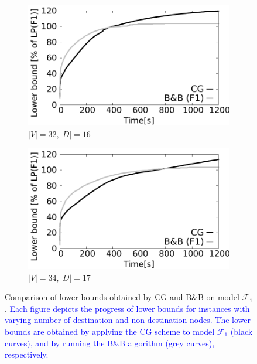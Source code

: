\begin{figure}[!htb]
    \begin{subfigure}[b]{0.49\textwidth}
        \includegraphics[width=\textwidth]{lower-bound-32-16}
        \caption{$|V|=32, |D|=16$}
        \label{fig:cggr32-16}
    \end{subfigure}
    \hfill %
    \begin{subfigure}[b]{0.49\textwidth}
        \includegraphics[width=\textwidth]{lower-bound-34-17}
        \caption{$|V|=34, |D|=17$}
        \label{fig:cggr34-17}
    \end{subfigure}
  \caption{Comparison of lower bounds obtained by CG and B\&B on model $\mathcal{F}_1$.
	\textcolor{blue}{Each figure depicts the progress of lower bounds for instances with varying number of destination and non-destination nodes.
	The lower bounds are obtained by applying the CG scheme to model $\mathcal{F}_1$ (black curves), and by running the B\&B algorithm (grey curves), respectively.
	}}
  \label{fig:cggr}
\end{figure} 

